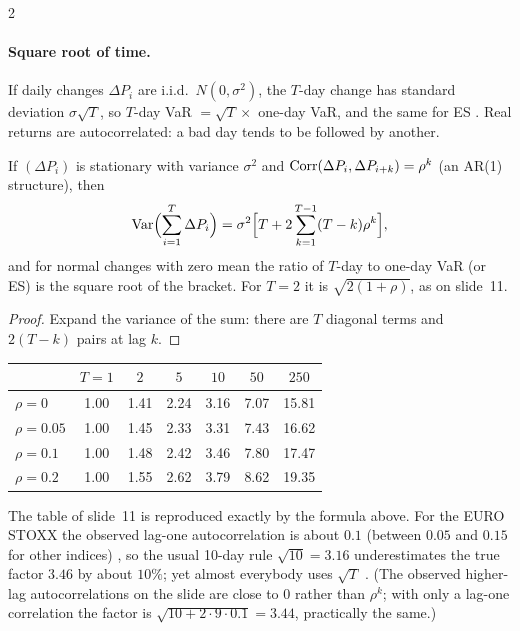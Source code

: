 \begin{paracol}{2}
\paragraph{Square root of time.} If daily changes $\Delta P_i$ are i.i.d.\ $N(0,\sigma^2)$, the $T$-day change has
standard deviation $\sigma\sqrt T$, so $T$-day VaR $=\sqrt T\times$ one-day VaR, and the same for ES
. Real returns are autocorrelated: a bad day tends to be followed by another.

\begin{proposition}\label{ch08:prop-autocorr}
If $(\Delta P_i)$ is stationary with variance $\sigma^2$ and $\operatorname{Corr}(\Delta P_i,\Delta P_{i+k})=\rho^k$ (an AR(1)
structure), then
\[
  \operatorname{Var}\Bigl(\sum_{i=1}^T\Delta P_i\Bigr)=\sigma^2\Bigl[T+2\sum_{k=1}^{T-1}(T-k)\rho^k\Bigr],
\]
and for normal changes with zero mean the ratio of $T$-day to one-day VaR (or ES) is the square root of the bracket.
For $T=2$ it is $\sqrt{2(1+\rho)}$, as on slide~11.
\end{proposition}
\begin{proof}
Expand the variance of the sum: there are $T$ diagonal terms and $2(T-k)$ pairs at lag $k$.
\end{proof}
\begin{center}\small
\begin{tabular}{@{}lcccccc@{}}
\toprule
 & $T=1$ & $2$ & $5$ & $10$ & $50$ & $250$\\
\midrule
$\rho=0$    & 1.00 & 1.41 & 2.24 & 3.16 & 7.07 & 15.81\\
$\rho=0.05$ & 1.00 & 1.45 & 2.33 & 3.31 & 7.43 & 16.62\\
$\rho=0.1$  & 1.00 & 1.48 & 2.42 & 3.46 & 7.80 & 17.47\\
$\rho=0.2$  & 1.00 & 1.55 & 2.62 & 3.79 & 8.62 & 19.35\\
\bottomrule
\end{tabular}
\end{center}
The table of slide~11 is reproduced exactly by the formula above. For the EURO STOXX the observed lag-one
autocorrelation is about $0.1$ (between $0.05$ and $0.15$ for other indices) , so the usual
10-day rule $\sqrt{10}=3.16$ underestimates the true factor $3.46$ by about $10\%$; yet almost everybody uses
$\sqrt T$ . (The observed higher-lag autocorrelations on the slide are close to $0$ rather than
$\rho^k$; with only a lag-one correlation the factor is $\sqrt{10+2\cdot9\cdot0.1}=3.44$, practically the same.)


\end{paracol}
